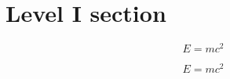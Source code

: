 \documentclass[12 pt]{article}
\begin{document}

\section{Level I section}
\lipsum[1]
\begin{Theorem*}
    \lipsum[2]
    \[
        E = mc^{2}
    \]
    \lipsum[3]
\end{Theorem*}
\begin{Theorem*}
    \lipsum[2]
    \[
        E = mc^{2}
    \]
    \lipsum[3]
\end{Theorem*}
\end{document}
